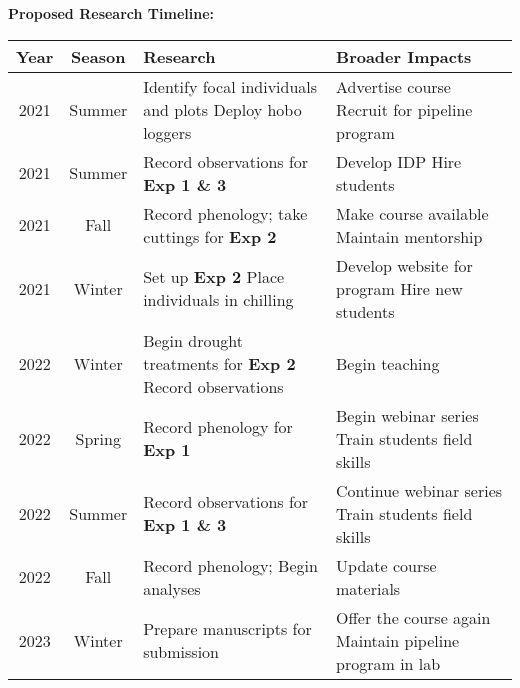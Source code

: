 \documentclass[11pt]{article}\usepackage[]{graphicx}\usepackage[]{color}
\begin{document}
{\noindent\Large{\textbf{Proposed Research Timeline:}}}
\begin{center}
\begin{tabular}{| c | c | p{62mm} | p{60mm} |}
\hline
\textbf{Year} & \textbf{Season} & \textbf{Research} & \textbf{Broader Impacts} \\
\hline
2021 & Summer & Identify focal individuals and plots \newline Deploy hobo loggers & Advertise course \newline Recruit for pipeline program\\
\hline
2021 & Summer & Record observations for \textbf{Exp 1 \& 3} & Develop IDP \newline Hire students  \\
\hline
2021 & Fall & Record phenology; take cuttings for \textbf{Exp 2} & Make course available \newline Maintain mentorship  \\
\hline
2021 & Winter & Set up \textbf{Exp 2} \newline Place individuals in chilling & Develop website for program \newline Hire new students  \\
\hline
2022 & Winter & Begin drought treatments for \textbf{Exp 2} \newline Record observations & Begin teaching  \\
\hline
2022 & Spring & Record phenology for \textbf{Exp 1} & Begin webinar series \newline Train students field skills  \\
\hline
2022 & Summer & Record observations for \textbf{Exp 1 \& 3} & Continue webinar series \newline Train students field skills  \\
\hline
2022 & Fall & Record phenology; Begin analyses & Update course materials  \\
\hline
2023 & Winter & Prepare manuscripts for submission & Offer the course again \newline Maintain pipeline program in lab\\
\hline
\end{tabular}
\end{center}





\iffalse
\end{document}
